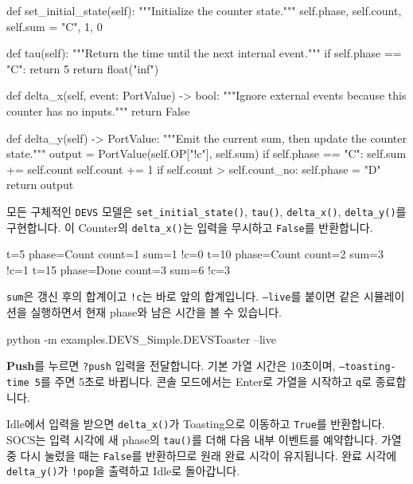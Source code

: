 \documentclass[11pt,a4paper]{article}
\newcommand{\api}[1]{\texttt{#1}}
\newcommand{\chaptermark}[1]{\par\noindent{\LARGE\color{ink}\bfseries #1}\par\smallskip}
\newcommand{\topic}[1]{\par\medskip{\large\color{accent}\bfseries #1}\par}
\begin{document}
\begin{Code}
def set_initial_state(self):
        """Initialize the counter state."""
        self.phase, self.count, self.sum = "C", 1, 0

def tau(self):
        """Return the time until the next internal event."""
        if self.phase == "C":
            return 5
        return float("inf")

def delta_x(self, event: PortValue) -> bool:
    """Ignore external events because this counter has no inputs."""
    return False

def delta_y(self) -> PortValue:
        """Emit the current sum, then update the counter state."""
        output = PortValue(self.OP["!c"], self.sum)
        if self.phase == "C":
            self.sum += self.count
            self.count += 1
            if self.count > self.count_no:
                self.phase = "D"
        return output
\end{Code}
모든 구체적인 \api{DEVS} 모델은 \api{set\_initial\_state()}, \api{tau()},
\api{delta\_x()}, \api{delta\_y()}를 구현합니다. 이 Counter의
\api{delta\_x()}는 입력을 무시하고 \api{False}를 반환합니다.

\begin{Code}
t=5  phase=Count count=1 sum=1 !c=0
t=10 phase=Count count=2 sum=3 !c=1
t=15 phase=Done  count=3 sum=6 !c=3
\end{Code}
\api{sum}은 갱신 후의 합계이고 \api{!c}는 바로 앞의 합계입니다.
\api{--live}를 붙이면 같은 시뮬레이션을 실행하면서 현재 phase와 남은 시간을 볼 수 있습니다.

\newpage
\chaptermark{2.1 \enspace DEVS (계속)}
\topic{2.1.2 \enspace DEVSToaster}
\begin{Code}
python -m examples.DEVS_Simple.DEVSToaster --live
\end{Code}
\textbf{Push}를 누르면 \api{?push} 입력을 전달합니다. 기본 가열 시간은 10초이며,
\api{--toasting-time 5}를 주면 5초로 바뀝니다. 콘솔 모드에서는 Enter로 가열을
시작하고 \api{q}로 종료합니다.

Idle에서 입력을 받으면 \api{delta\_x()}가 Toasting으로 이동하고 \api{True}를 반환합니다.
SOCS는 입력 시각에 새 phase의 \api{tau()}를 더해 다음 내부 이벤트를 예약합니다.
가열 중 다시 눌렀을 때는 \api{False}를 반환하므로 원래 완료 시각이 유지됩니다.
완료 시각에 \api{delta\_y()}가 \api{!pop}을 출력하고 Idle로 돌아갑니다.
\end{document}
